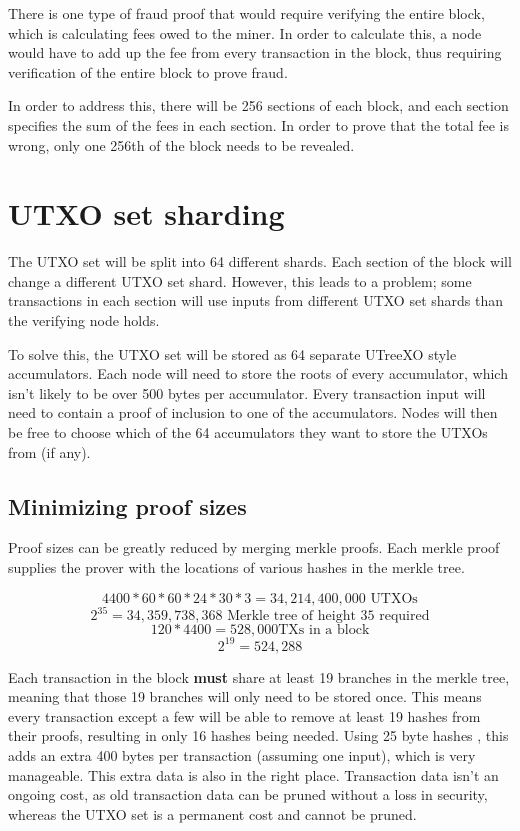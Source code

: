 \documentclass[12pt, letterpaper]{article}
\begin{document}
There is one type of fraud proof that would require verifying the entire block,
which is calculating fees owed to the miner. In order to calculate this, a node
would have to add up the fee from every transaction in the block, thus requiring
verification of the entire block to prove fraud.

In order to address this, there will be 256 sections of each block, and each
section specifies the sum of the fees in each section. In order to prove that
the total fee is wrong, only one 256th of the block needs to be revealed.

\section{UTXO set sharding}
The UTXO set will be split into 64 different shards. Each section of the block
will change a different UTXO set shard. However, this leads to a problem; some
transactions in each section will use inputs from different UTXO set shards than
the verifying node holds.

To solve this, the UTXO set will be stored as 64 separate UTreeXO \cite{UTreeXO}
style accumulators. Each node will need to store the roots of every accumulator,
which isn't likely to be over 500 bytes per accumulator. Every transaction input
will need to contain a proof of inclusion to one of the accumulators. Nodes will
then be free to choose which of the 64 accumulators they want to store the UTXOs
from (if any).

\subsection{Minimizing proof sizes}
Proof sizes can be greatly reduced by merging merkle proofs. Each merkle proof
supplies the prover with the locations of various hashes in the merkle tree.

\[ 4400 * 60 * 60 * 24 * 30 * 3 = 34,214,400,000 \textrm{ UTXOs} \]
\[ 2^{35} = 34,359,738,368 \textrm{ Merkle tree of height 35 required} \]
\[ 120 * 4400 = 528,000 \textrm{TXs in a block} \]
\[ 2^{19} = 524,288 \]

Each transaction in the block \textbf{must} share at least 19 branches in the
merkle tree, meaning that those 19 branches will only need to be stored once.
This means every transaction except a few will be able to remove at least 19
hashes from their proofs, resulting in only 16 hashes being needed. Using 25
byte hashes \footnotemark, this adds an extra 400 bytes per transaction
(assuming one input), which is very manageable. This extra data is also in the
right place.  Transaction data isn't an ongoing cost, as old transaction data
can be pruned without a loss in security, whereas the UTXO set is a permanent
cost and cannot be pruned.
\end{document}
